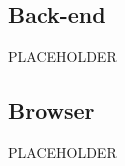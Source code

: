 \documentclass[../glossario.tex]{subfiles}
\begin{document}
\subsection*{Back-end}
PLACEHOLDER

\subsection*{Browser}
PLACEHOLDER
    
\end{document}
